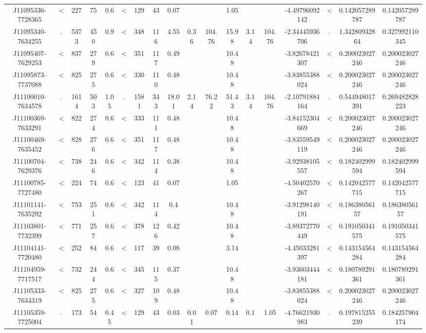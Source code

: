 \begin{table}
\begin{tabular}{cccccccccccccccccc}
J11095336-7728365 & < & 227 & 75 & 0.6 & < & 129 & 43 & 0.07 &  &  & 1.05 &  &  & -4.49796092142 & < & 0.142057289787 & 0.142057289787 \\
J11095340-7634255 & . & 5373 & 450 & 0.9 & < & 348 & 116 & 4.55 & 0.36 & 104.76 & 15.98 & 3.14 & 104.76 & -2.34445936706 & . & 1.34280932864 & 0.327992110345 \\
J11095407-7629253 & < & 837 & 279 & 0.6 & < & 351 & 117 & 0.49 &  &  & 10.48 &  &  & -3.82678421307 & < & 0.200023027246 & 0.200023027246 \\
J11095873-7737088 & < & 825 & 275 & 0.6 & < & 330 & 110 & 0.48 &  &  & 10.48 &  &  & -3.83855388024 & < & 0.200023027246 & 0.200023027246 \\
J11100010-7634578 & . & 1614 & 503 & 1.05 & . & 1581 & 343 & 18.01 & 2.14 & 76.22 & 51.43 & 3.14 & 104.76 & -2.10791884164 & . & 0.544948017391 & 0.269482828223 \\
J11100369-7633291 & < & 822 & 274 & 0.6 & < & 333 & 111 & 0.48 &  &  & 10.48 &  &  & -3.84152304669 & < & 0.200023027246 & 0.200023027246 \\
J11100469-7635452 & < & 828 & 276 & 0.6 & < & 351 & 117 & 0.48 &  &  & 10.48 &  &  & -3.83559549119 & < & 0.200023027246 & 0.200023027246 \\
J11100704-7629376 & < & 738 & 246 & 0.6 & < & 342 & 114 & 0.38 &  &  & 10.48 &  &  & -3.92938105557 & < & 0.182402999594 & 0.182402999594 \\
J11100785-7727480 & < & 224 & 74 & 0.6 & < & 123 & 41 & 0.07 &  &  & 1.05 &  &  & -4.50402570267 & < & 0.142042577715 & 0.142042577715 \\
J11101141-7635292 & < & 753 & 251 & 0.6 & < & 342 & 114 & 0.4 &  &  & 10.48 &  &  & -3.91298140191 & < & 0.18638056157 & 0.18638056157 \\
J11103801-7732399 & < & 771 & 257 & 0.6 & < & 378 & 126 & 0.42 &  &  & 10.48 &  &  & -3.89372770449 & < & 0.191050341575 & 0.191050341575 \\
J11104141-7720480 & < & 252 & 84 & 0.6 & < & 117 & 39 & 0.08 &  &  & 3.14 &  &  & -4.45033281397 & < & 0.143154564284 & 0.143154564284 \\
J11104959-7717517 & < & 732 & 244 & 0.6 & < & 345 & 115 & 0.37 &  &  & 10.48 &  &  & -3.93603444181 & < & 0.180789291361 & 0.180789291361 \\
J11105333-7634319 & < & 825 & 275 & 0.6 & < & 327 & 109 & 0.48 &  &  & 10.48 &  &  & -3.83855388024 & < & 0.200023027246 & 0.200023027246 \\
J11105359-7725004 & . & 173 & 54 & 0.45 & < & 129 & 43 & 0.03 & 0.01 & 0.07 & 0.14 & 0.1 & 1.05 & -4.76621930983 & . & 0.197815255239 & 0.184257904174 \\

\end{tabular}
\end{table}

